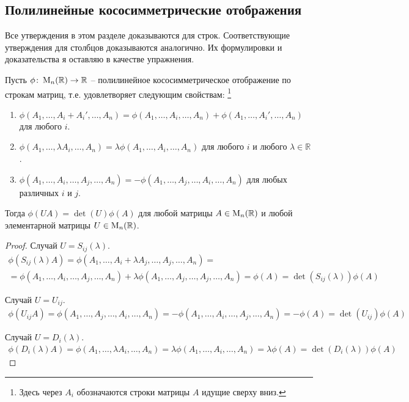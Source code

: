 \subsection{Полилинейные кососимметрические отображения}

Все утверждения в этом разделе доказываются для строк.
Соответствующие утверждения для столбцов доказываются аналогично.
Их формулировки и доказательства я оставляю в качестве упражнения.

\begin{claim}
\label{claim::PolyAntiAndElementary}
Пусть $\phi\colon \operatorname{M}_{n}(\mathbb R)\to \mathbb R$ -- полилинейное кососимметрическое отображение по строкам матриц, т.е. удовлетворяет следующим свойствам:%
\footnote{Здесь через $A_i$ обозначаются строки матрицы $A$ идущие сверху вниз.}
\begin{enumerate}
\item $\phi(A_1,\ldots, A_i + A_i', \ldots, A_n) = \phi(A_1,\ldots, A_i, \ldots, A_n) + \phi(A_1,\ldots,A_i', \ldots, A_n)$ для любого $i$.

\item $\phi(A_1,\ldots, \lambda A_i, \ldots, A_n) = \lambda \phi(A_1,\ldots, A_i, \ldots, A_n)$ для любого $i$ и любого $\lambda\in\mathbb R$.

\item $\phi(A_1,\ldots, A_i, \ldots, A_j, \ldots, A_n) = -\phi(A_1,\ldots, A_j, \ldots, A_i, \ldots, A_n)$ для любых различных $i$ и $j$.
\end{enumerate}
Тогда $\phi(UA) = \det(U)\phi(A)$ для любой матрицы $A\in\operatorname{M}_{n}(\mathbb R)$ и любой элементарной матрицы $U\in\operatorname{M}_{n}(\mathbb R)$.
\end{claim}
\begin{proof}
Случай $U = S_{ij}(\lambda)$.
\begin{gather*}
\phi(S_{ij}(\lambda)A) = \phi(A_1,\ldots, A_i + \lambda A_j, \ldots, A_j, \ldots, A_n) = \\
= \phi(A_1,\ldots, A_i, \ldots, A_j, \ldots, A_n) + \lambda\phi(A_1,\ldots, A_j, \ldots, A_j, \ldots, A_n) =  \phi(A) = \det(S_{ij}(\lambda))\phi(A)
\end{gather*}

Случай $U= U_{ij}$.
\begin{gather*}
\phi(U_{ij}A) = \phi(A_1,\ldots, A_j, \ldots, A_i, \ldots, A_n) = -\phi(A_1,\ldots, A_i, \ldots, A_j, \ldots, A_n) = -\phi(A) = \det(U_{ij})\phi(A)
\end{gather*}

Случай $U=D_i(\lambda)$.
\begin{gather*}
\phi(D_i(\lambda)A) = \phi(A_1,\ldots,\lambda A_i,\ldots, A_n) = \lambda \phi(A_1,\ldots, A_i,\ldots, A_n) = \lambda \phi(A) = \det(D_i(\lambda))\phi(A)
\end{gather*}
\end{proof}

